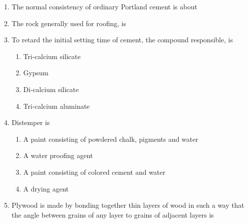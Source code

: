 \documentclass[11pt,a4paper]{article}
\begin{document}
\begin{enumerate}
\item{The normal consistency of ordinary Portland cement is about}
\\
\item{The rock generally used for roofing, is}
\\
\item{To retard the initial setting time of cement, the compound responsible, is}
\begin{enumerate}[label=\Alph*.]
\item{Tri-calcium silicate}
\item{Gypsum}
\item{Di-calcium silicate}
\item{Tri-calcium aluminate}
\end{enumerate}
\item{Distemper is}
\begin{enumerate}[label=\Alph*.]
\item{A paint consisting of powdered chalk, pigments and water}
\item{A water proofing agent}
\item{A paint consisting of colored cement and water}
\item{A drying agent}
\end{enumerate}
\item{Plywood is made by bonding together thin layers of wood in such a way that the angle between grains of any layer to grains of adjacent layers is}
\\
\end{enumerate}
\end{document}
